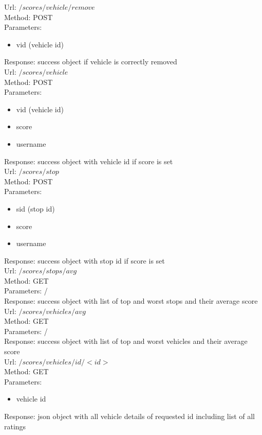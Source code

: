 \documentclass[12pt,a4paper]{article}
\begin{document}
\pagebreak
Url: $/scores/vehicle/remove$\\
Method: POST\\
Parameters:\begin{itemize}
\item vid (vehicle id)
\end{itemize}
Response: success object if vehicle is correctly removed\\

Url: $/scores/vehicle$\\
Method: POST\\
Parameters:\begin{itemize}
\item vid (vehicle id)
\item score
\item username
\end{itemize}
Response: success object with vehicle id if score is set\\

Url: $/scores/stop$\\
Method: POST\\
Parameters:\begin{itemize}
\item sid (stop id)
\item score
\item username
\end{itemize}
Response: success object with stop id if score is set\\

Url: $/scores/stops/avg$\\
Method: GET\\
Parameters: /\\
Response: success object with list of top and worst stops and their average score\\

Url: $/scores/vehicles/avg$\\
Method: GET\\
Parameters: /\\
Response: success object with list of top and worst vehicles and their average score\\

Url: $/scores/vehicles/id/<id>$\\
Method: GET\\
Parameters: \begin{itemize}
\item vehicle id
\end{itemize}
Response: json object with all vehicle details of requested id including list of all ratings\\
\end{document}
